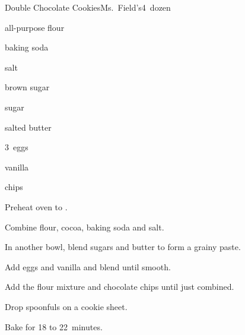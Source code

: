 \begin{recipe}{Double Chocolate Cookies}{Ms.~Field's}{4~dozen}

\begin{ingredients}
\item \C{2\quarter} all-purpose flour
\item \C{\half} 
\item \tp{\half} baking soda
\item \tp{\quarter} salt
\item {} brown sugar
\item \C{\threequarter} sugar
\item {} salted butter
\item 3~eggs
\item {} vanilla
\item {}  chips
\end{ingredients}

\begin{directions}
\item Preheat oven to .
\item Combine flour, cocoa, baking soda and salt.
\item In another bowl, blend sugars and butter to form a grainy paste.
\item Add eggs and vanilla and blend until smooth.
\item Add the flour mixture and chocolate chips until just combined.
\item Drop spoonfuls on a cookie sheet.
\item Bake for 18 to 22~minutes.
\end{directions}
\end{recipe}
